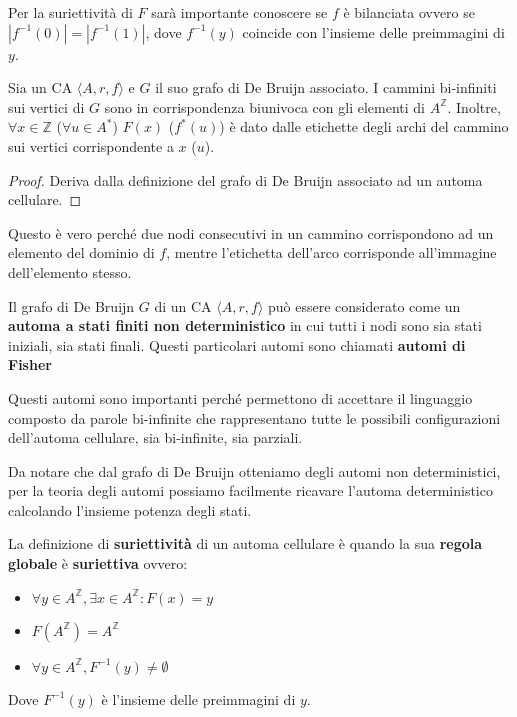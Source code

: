\begin{nota}
    Per la suriettività di $F$ sarà importante conoscere se $f$ è bilanciata ovvero
    se $|f^{-1}(0)| =|f^{-1}(1)|$, dove $  f^{-1}(y)$ coincide con l'insieme delle 
    preimmagini di $y$.
\end{nota}

\begin{nota}
    Sia un CA $\langle A,r,f\rangle$ e $G$ il suo grafo di De Bruijn associato.
    I cammini bi-infiniti sui vertici di $G$ sono in corrispondenza biunivoca 
    con gli elementi di $A^\mathbb{Z}$. Inoltre, $\forall x\in \mathbb{Z}$ ($ \forall u\in A^\ast$)
    $F(x)$ ($f^\ast(u)$) è dato dalle etichette degli archi del cammino sui vertici
    corrispondente a $x$ ($u$).
    \begin{proof}
        Deriva dalla definizione del grafo di De Bruijn associato ad un automa cellulare.
    \end{proof}
\end{nota}

Questo è vero perché due nodi consecutivi in un cammino corrispondono ad un elemento
del dominio di $f$, mentre l'etichetta dell'arco corrisponde all'immagine dell'elemento 
stesso.

\begin{nota}
    Il grafo di De Bruijn $G$ di un CA $\langle A,r,f\rangle$ può essere considerato
    come un \textbf{automa a stati finiti non deterministico} in cui tutti i nodi sono sia stati iniziali, sia 
    stati finali. Questi particolari automi sono chiamati \textbf{automi di Fisher}
\end{nota}

Questi automi sono importanti perché permettono di accettare il linguaggio composto
da parole bi-infinite che rappresentano tutte le possibili configurazioni dell'automa
cellulare, sia bi-infinite, sia parziali.

Da notare che dal grafo di De Bruijn otteniamo degli automi non deterministici, 
per la teoria degli automi possiamo facilmente ricavare l'automa deterministico
calcolando l'insieme potenza degli stati.

\begin{definizione} 
    La definizione di \textbf{suriettività} di un automa cellulare è quando la sua 
    \textbf{regola globale} è \textbf{suriettiva} ovvero:
    \begin{itemize}
        \item $\forall y\in A^\mathbb{Z},\exists x\in A^\mathbb{Z}: F(x) = y$
        \item $F(A^\mathbb{Z}) = A^\mathbb{Z}$
        \item $\forall y \in A^\mathbb{Z}, F^{-1}(y) \ne \emptyset $
    \end{itemize}
    Dove $F^{-1}(y)$ è l'insieme delle preimmagini di $y$.
\end{definizione}

